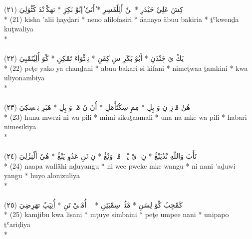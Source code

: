 \documentclass[a4paper, 12pt]{report}
\begin{document}
\begin{center}
\textarabic{(٢١) \textcolor{mygreen}{كِشَ عَلِيْ حَيْدَرِ  * نٖنٗ أَلِلٗفَسِرِ  * ٰأَنَيٗ ٰإبُوْ بَكِرَِ  * تهكْوٖنْدَ كُٹْوَلِيَ }} \\* 
(21) kisha 'alii ḥayḏari  * neno alilofasiri  * äanayo äbuu bakiria  * ṯʿkwenḏa kuţwaliya  \\* 
 \\ 
\\[8mm] 

\textarabic{(٢٢) \textcolor{mygreen}{پٖٹٖ يَكٗ يَ چَنْدَنِ  * أَبُوْ بَكَرِ سِ كِفَنِ  * نِمٖٹْوَاءَ تَمْكِنِ  * كْوَ أُلِيٗنَمْبِيَ }} \\* 
(22) peţe yako ya chanḏani  * abuu bakari si kifani  * nimeţwaa ṯamkini  * kwa uliyonambiya  \\* 
 \\ 
\\[8mm] 

\textarabic{(٢٣) \textcolor{mygreen}{هُنُ مْوٖزِ نِ وَ پِلِ  * مِمِ سِكُتَأَمَلِ  * أُنَ نَ مْكٖ وَ پِلِ  * هَبَرِ نِمٖسِكِيَ }} \\* 
(23) hunu mwezi ni wa pili  * mimi sikuṯaamali  * una na mke wa pili  * habari nimesikiya  \\* 
 \\ 
\\[8mm] 

\textarabic{(٢٤) \textcolor{mygreen}{نَأَپَ وَاللّٰهِ نْدُيَنْڠُ  * نِ وٖيْ پْوٖكٖ مْكٖ وَنْڠُ  * نِ نَنِ عَدُوِ يَنْڠُ  * هُيٗ أَلٗنِزُلِيَ }} \\* 
(24) naapa wallähi nḏuyangu  * ni wee pweke mke wangu  * ni nani 'aḏuwi yangu  * huyo alonizuliya  \\* 
 \\ 
\\[8mm] 

\textarabic{(٢٥) \textcolor{mygreen}{كَمْجِبُ كْوَ لِسَنِ  * مْٹُيٖ سِمْبَئِنِ  * پٖٹٖ أُمْپٖيْ نَنِ  * أُنِپَپٗ تهَرِضِيَ }} \\* 
(25) kamjibu kwa lisani  * mţuye simbaini  * peţe umpee nani  * unipapo ṯʿariḍiya  \\* 
 \\ 
\\[8mm] 


\end{center}
\end{document}
